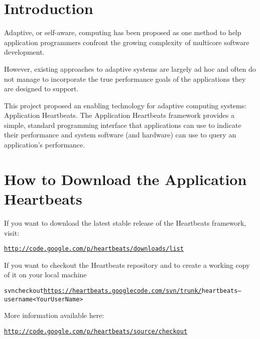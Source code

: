 \hypertarget{index_intro}{}\section{Introduction}\label{index_intro}
Adaptive, or self-aware, computing has been proposed as one method to help application programmers confront the growing complexity of multicore software development.

However, existing approaches to adaptive systems are largely ad hoc and often do not manage to incorporate the true performance goals of the applications they are designed to support.

This project proposed an enabling technology for adaptive computing systems: Application Heartbeats. The Application Heartbeats framework provides a simple, standard programming interface that applications can use to indicate their performance and system software (and hardware) can use to query an application's performance.



 \hypertarget{index_download}{}\section{How to Download the Application Heartbeats}\label{index_download}
If you want to download the latest stable release of the Heartbeats framework, visit:

\small\begin{alltt}\href{http://code.google.com/p/heartbeats/downloads/list}{\tt http://code.google.com/p/heartbeats/downloads/list}\end{alltt}
\normalsize 


If you want to checkout the Heartbeats repository and to create a working copy of it on your local machine

\small\begin{alltt}svn checkout \href{https://heartbeats.googlecode.com/svn/trunk/}{\tt https://heartbeats.googlecode.com/svn/trunk/} heartbeats --username <YourUserName> \end{alltt}
\normalsize 


More information available here: \small\begin{alltt}\href{http://code.google.com/p/heartbeats/source/checkout}{\tt http://code.google.com/p/heartbeats/source/checkout} \end{alltt}
\normalsize 




